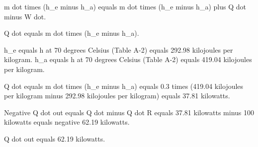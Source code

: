 m dot times (h_e minus h_a) equals m dot times (h_e minus h_a) plus Q dot minus W dot.  

Q dot equals m dot times (h_e minus h_a).  

h_e equals h at 70 degrees Celsius (Table A-2) equals 292.98 kilojoules per kilogram.  
h_a equals h at 70 degrees Celsius (Table A-2) equals 419.04 kilojoules per kilogram.  

Q dot equals m dot times (h_e minus h_a) equals 0.3 times (419.04 kilojoules per kilogram minus 292.98 kilojoules per kilogram) equals 37.81 kilowatts.  

Negative Q dot out equals Q dot minus Q dot R equals 37.81 kilowatts minus 100 kilowatts equals negative 62.19 kilowatts.  

Q dot out equals 62.19 kilowatts.